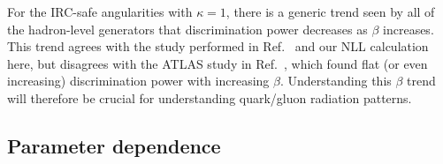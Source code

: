 \documentclass[11pt,letterpaper]{article}
\DeclareRobustCommand{\Ref}[1]{Ref.~\cite{#1}}
\begin{document}
For the IRC-safe angularities with $\kappa = 1$, there is a generic
trend seen by all of the hadron-level generators that discrimination
power decreases as $\beta$ increases.  This trend agrees with the
study performed in \Ref{Larkoski:2013eya} and our NLL calculation
here, but disagrees with the ATLAS study in \Ref{Aad:2014gea}, which
found flat (or even increasing) discrimination power with increasing
$\beta$.  Understanding this $\beta$ trend will therefore be crucial
for understanding quark/gluon radiation patterns.

\subsection{Parameter dependence}
\label{sec:ee_scales}

\begin{figure}
\centering
{}
$\qquad$


\end{figure}
\end{document}

